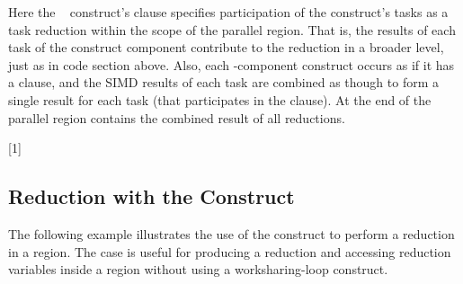 Here the ~ construct's 
 clause specifies participation of the construct's tasks as 
a task reduction within the scope of the parallel region.  
That is, the results of each task of the  construct component 
contribute to the reduction in a broader level, just as in  code section above.
Also, each -component construct
occurs as if it has a  clause, and the
SIMD results of each task are combined as though to form a single result for
each task (that participates in the  clause).
At the end of the parallel region  contains the combined result of all reductions.




[1]


\subsection{Reduction with the  Construct}
\label{subsec:reduction_scope}

The following example illustrates the use of the  construct 
to perform a reduction in a  region. The case is useful for 
producing a reduction and accessing reduction variables inside a  region 
without using a worksharing-loop construct.

\clearpage


